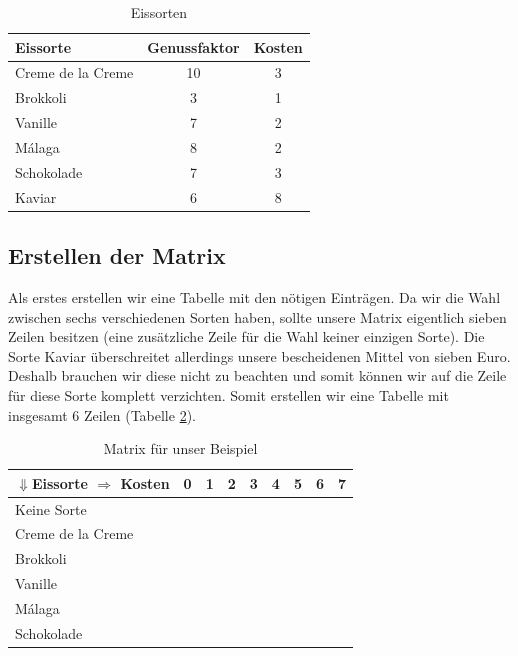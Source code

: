 \documentclass[a4paper, 12pt]{article}
\begin{document}
\begin{table}[H]
	\begin{center}
		\begin{tabular}{lcc}
			Eissorte & Genussfaktor & Kosten\\
			\hline
			Creme de la Creme	& 10	& 3\\
			Brokkoli			& 3		& 1\\
			Vanille				& 7		& 2\\
			Málaga				& 8		& 2\\
			Schokolade			& 7		& 3\\
			Kaviar				& 6		& 8\\
		\end{tabular}
	\end{center}
\caption{Eissorten}
\label{table:Label}
\end{table}

\subsection{Erstellen der Matrix}

Als erstes erstellen wir eine Tabelle mit den nötigen Einträgen. Da wir die Wahl zwischen sechs verschiedenen Sorten haben, sollte unsere Matrix eigentlich sieben Zeilen besitzen (eine zusätzliche Zeile für die Wahl keiner einzigen Sorte). Die Sorte Kaviar überschreitet allerdings unsere bescheidenen Mittel von sieben Euro. Deshalb brauchen wir diese nicht zu beachten und somit können wir auf die Zeile für diese Sorte komplett verzichten. Somit erstellen wir eine Tabelle mit insgesamt 6 Zeilen (Tabelle \ref{table:Leer}).

\begin{table}[H]
	\begin{center}
		\begin{tabular}{l|cccccccc}
			$\Downarrow$Eissorte $\Rightarrow$ Kosten & 0 & 1 & 2 & 3 & 4 & 5 &
			6 & 7\\
			\hline
			Keine Sorte			&	&	&	&	&	&	&	&\\
			Creme de la Creme	&	&	&	&	&	&	&	&\\
			Brokkoli			&	&	&	&	&	&	&	&\\
			Vanille				&	&	&	&	&	&	&	&\\
			Málaga				&	&	&	&	&	&	&	&\\
			Schokolade			&	&	&	&	&	&	&	&\\
		\end{tabular}
	\end{center}
\caption{Matrix für unser Beispiel}
\label{table:Leer}
\end{table}
\end{document}
